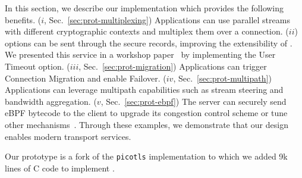 \label{sec:content}

In this section, we describe our \tcpls implementation which provides the
following benefits. ($i$, Sec.~\ref{sec:prot-multiplexing}) Applications can use parallel streams with different cryptographic  contexts and multiplex them over a \tcp connection.
($ii$) \tcp options can be sent through the secure \tcpls records, improving
the extensibility of \tcp. We presented this service in a workshop
paper~\cite{rochet2020tcpls} by implementing the \tcp User Timeout option.
($iii$, Sec.~\ref{sec:prot-migration}) Applications can trigger  Connection Migration and enable Failover. ($iv$, Sec.~\ref{sec:prot-multipath}) Applications can leverage  multipath  capabilities such as stream  steering %
and bandwidth aggregation.
($v$, Sec.~\ref{sec:prot-ebpf}) The server can securely send eBPF  bytecode to the client  to upgrade its \tcp congestion control scheme or tune other \tcp
mechanisms~\cite{brakmo2017tcp,tran2019beyond}. Through these examples,
we demonstrate that our design enables modern transport services.

Our prototype is a fork of the \texttt{picotls}  implementation 
to which we added 9k lines of C code to implement \tcpls.

